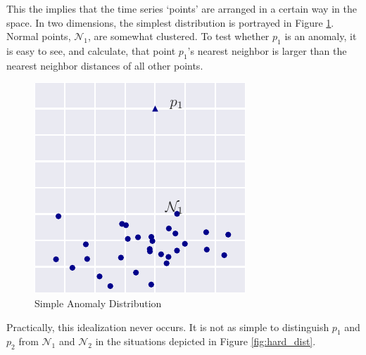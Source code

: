This the implies that the time series `points' are arranged in a certain way in the space. In two dimensions, the simplest distribution is portrayed in Figure \ref{fig:simple_dist}. Normal points, $\mathcal{N}_1$, are somewhat clustered. To test whether $p_1$ is an anomaly, it is easy to see, and calculate, that point $p_1$'s nearest neighbor is larger than the nearest neighbor distances of all other points.

\begin{figure}[H]
  \centering
  \includegraphics{figs/simple_dist.pdf}
  \caption{Simple Anomaly Distribution}
  \label{fig:simple_dist}
\end{figure}

Practically, this idealization never occurs. It is not as simple to distinguish $p_1$ and $p_2$ from $\mathcal{N}_1$ and $\mathcal{N}_2$ in the situations depicted in Figure \ref{fig:hard_dist}.

